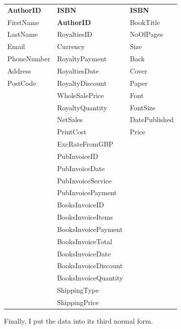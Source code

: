 \begin{tabular}{|p{2.5cm}|p{3.5cm}|p{2.5cm}|}
    \hline
    \textbf{AuthorID} & \textbf{ISBN} & \textbf{ISBN} \\
    FirstName & \textbf{AuthorID} & BookTitle \\
    LastName & RoyaltiesID & NoOfPages \\
    Email  & Currency & Size \\
    PhoneNumber & RoyaltyPayment & Back \\
    Address & RoyaltiesDate & Cover \\
    PostCode & RoyaltyDiscount & Paper \\
    & WholeSalePrice & Font \\
    & RoyaltyQuantity & FontSize \\
    & NetSales & DatePublished \\
    & PrintCost & Price \\
    & ExcRateFromGBP & \\
    & PubInvoiceID & \\
    & PubInvoiceDate & \\
    & PubInvoiceService & \\
    & PubInvoicePayment & \\
    & BooksInvoiceID & \\
    & BooksInvoiceItems & \\
    & BooksInvoicePayment & \\
    & BooksInvoiceTotal & \\
    & BooksInvoiceDate & \\
    & BooksInvoiceDiscount & \\
    & BooksInvoiceQuantity & \\
    & ShippingType & \\
    & ShippingPrice & \\
    \hline
\end{tabular}

\newpage
Finally, I put the data into its third normal form.

